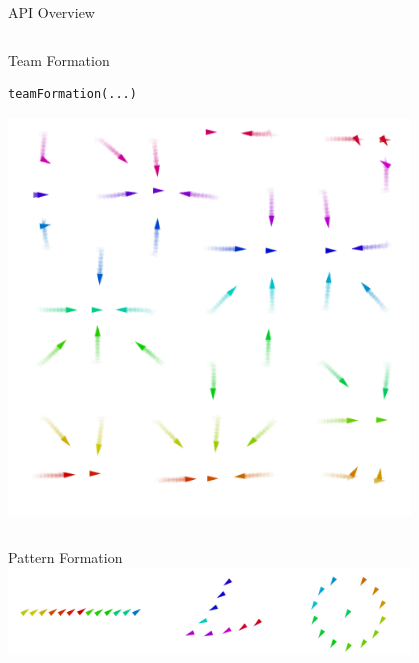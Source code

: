 \documentclass[presentation, 9pt]{beamer}\mode<presentation>{\usetheme{AMSBolognaFC}}
\begin{document}
\begin{frame}[fragile]{API Overview}
\begin{columns}
\begin{column}{0.3\textwidth}
	\begin{exampleblock}{Team Formation}

\begin{verbatim}
teamFormation(...)
\end{verbatim}
	\centering
	\includegraphics[width=0.8\textwidth]{img/team-formation-base.png}
	\end{exampleblock}
\end{column}
	
\end{columns}
\begin{exampleblock}{Pattern Formation}
\centering
\includegraphics[width=0.8\textwidth]{img/shapes.png}
\end{exampleblock}
\end{frame}
\end{document}
